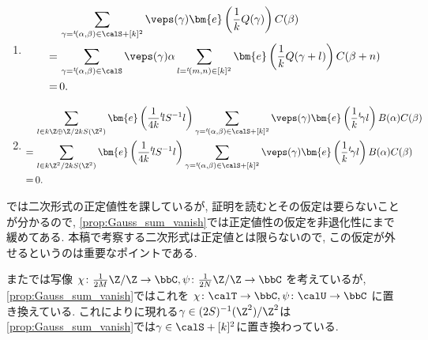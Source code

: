 \documentclass[11pt,b5paper,oneside,lualatex]{ltjsarticle} %
\numberwithin{equation}{section} %
\begin{document}
\begin{prop}
\begin{enumerate}
		\item \label{item:prop:Gauss_sum_vanish1}
		\begin{align}
			&\sum_{\gamma = {}^t\!(\alpha, \beta) \in \calS + [k]^2} \veps(\gamma)
			\bm{e}\left( \frac{1}{k} Q(\gamma) \right) C(\beta)
			\\
			= \,
			&\sum_{\gamma = {}^t\!(\alpha, \beta) \in \calS} 
			\veps(\gamma) \alpha
			\sum_{l = {}^t\!(m, n) \in [k]^2}
			\bm{e}\left( \frac{1}{k} Q(\gamma + l) \right) C(\beta + n)
			\\			
			= \,
			&0.
		\end{align}
		\item \label{item:prop:Gauss_sum_vanish2}
		\begin{align}
			&\sum_{l \in k\Z \oplus \Z/2kS(\Z^2)} \bm{e}\left( \frac{1}{4k} {^t\!l} S^{-1} l \right)
			\sum_{\gamma = {}^t\!(\alpha, \beta) \in \calS + [k]^2} \veps(\gamma)
			\bm{e}\left( \frac{1}{k} {^t\!\gamma} l \right) B(\alpha) C(\beta) \\
			= \,
			&\sum_{l \in k\Z^2/2kS(\Z^2)} \bm{e}\left( \frac{1}{4k} {^t\!l} S^{-1} l \right)
			\sum_{\gamma = {}^t\!(\alpha, \beta) \in \calS + [k]^2} \veps(\gamma)
			\bm{e}\left( \frac{1}{k} {^t\!\gamma} l \right) B(\alpha) C(\beta) \\
			= \,
			&0.
		\end{align}
	\end{enumerate}	
\end{prop}

%	
%	

\begin{rem}
	\cite[Proposition 4.2]{MM}では二次形式の正定値性を課しているが, 証明を読むとその仮定は要らないことが分かるので, \cref{prop:Gauss_sum_vanish}では正定値性の仮定を非退化性にまで緩めてある. 
	本稿で考察する二次形式は正定値とは限らないので, この仮定が外せるというのは重要なポイントである. 
	
	また\cite[Proposition 4.2]{MM}では写像
	$ \chi \colon \frac{1}{2M}\Z/\Z \to \bbC, \psi \colon \frac{1}{2N}\Z/\Z \to \bbC $
	を考えているが, \cref{prop:Gauss_sum_vanish}ではこれを
	$ \chi \colon \calT \to \bbC, \psi \colon \calU \to \bbC $
	に置き換えている. 
	これにより\cite[Proposition 4.2]{MM}に現れる$ \gamma \in (2S)^{-1}(\Z^2)/\Z^2 $は\cref{prop:Gauss_sum_vanish}では$ \gamma \in \calS + [k]^2 $に置き換わっている. 
\end{rem}
\end{document}
